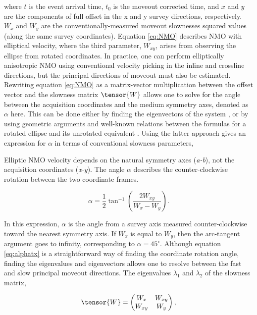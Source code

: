 \noindent where $t$ is the event arrival time, $t_0$ is the moveout corrected time, and $x$ and $y$ are the components of full offset in the x and y survey directions, respectively. $W_x$ and $W_y$ are the conventional\-ly-measured moveout slownesses squared values (along the same survey coordinates).  Equation \ref{eq:NMO} describes NMO with elliptical velocity, where the third parameter, $W_{xy}$, arises from observing the ellipse from rotated coordinates.  In practice, one can perform elliptically anisotr\-opic NMO using conventional velocity picking in the inline and crossline directions, but the principal directions of moveout must also be estimated.  Rew\-riting equation \ref{eq:NMO} as a matrix-vector multiplication between the offset vector and the slowness matrix $\tensor{W}$ allows one to solve for the angle between the acquisition coordinates and the medium symmetry axes, denoted as $\alpha $ here.  This can be done either by finding the eigenvectors of the system  \cite[]{GEO63-03-10791092}, or by using geometric arguments and well-known relations between the formulas for a rotated ellipse and its unrotated equivalent \cite[]{mathworld_quadcrv}. Using the latter approach gives an expression for $\alpha $ in terms of conventional slowness parameters,

  {Elliptic NMO velocity depends on the natural symmetry axes (\textit{a-b}), not the acquisition coordinates (\textit{x-y}).  The angle $\alpha$ describes the counter-clockwise rotation between the two coordinate frames.}

\begin{equation}
\label{eq:alphatx}
\alpha  =\frac{1}{2}\tan ^{-1}\left(\frac{2W_{xy}}{W_x-W_y}\right).
\end{equation}

\noindent In this expression, $\alpha $ is the angle from a survey axis measured counter-clockwise toward the nearest symmetry axis.  If $W_x$ is equal to $W_y$, then the arc-tangent argument goes to infinity, corresponding to $\alpha =45^\circ $.  Although equation \ref{eq:alphatx} is a straightforward way of finding the coordinate rotation angle, finding the eigenvalues and eigenvectors allows one to resolve between the fast and slow principal moveout directions.  The eigenvalues $\lambda _1$ and $\lambda _2$ of the slowness matrix,


\begin{equation}
\label{eq:Wmat}
\tensor{W}=\begin{pmatrix} W_x & W_{xy} \cr W_{xy} & W_y \end{pmatrix},
\end{equation}


